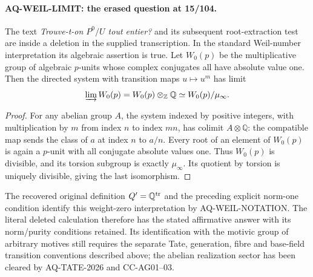 \documentclass[11pt,a4paper]{article}
\theoremstyle{definition}\newtheorem{definition}[theorem]{Definition}
\theoremstyle{remark}\newtheorem{remark}[theorem]{Remark}
\begin{document}
\paragraph{AQ-WEIL-LIMIT: the erased question at 15/104.}
The text \emph{Trouve-t-on $P^0/U$ tout entier?}
and its subsequent root-extraction test are inside a
deletion in the supplied transcription. In the standard
Weil-number interpretation its algebraic assertion is true.
Let $W_0(p)$ be the multiplicative group of algebraic
$p$-units whose complex conjugates all have absolute
value one. Then the directed system with transition
maps $u\mapsto u^m$ has limit
\[
 \varinjlim W_0(p)=W_0(p)\otimes_{\mathbb Z}\mathbb Q
                 \simeq W_0(p)/\mu_\infty .
\]
\begin{proof}
For any abelian group $A$, the system indexed by
positive integers, with multiplication by $m$ from
index $n$ to index $mn$, has colimit
$A\otimes\mathbb Q$: the compatible map sends
the class of $a$ at index $n$ to $a/n$.
Every root of an element of $W_0(p)$ is again
a $p$-unit with all conjugate absolute values one.
Thus $W_0(p)$ is divisible, and its torsion subgroup
is exactly $\mu_\infty$. Its quotient by torsion
is uniquely divisible, giving the last isomorphism.
\end{proof}
The recovered original definition $Q'=\mathbb Q^{\rm tr}$
and the preceding explicit norm-one condition identify
this weight-zero interpretation by AQ-WEIL-NOTATION.
The literal deleted calculation therefore has the stated
affirmative answer with its norm/purity conditions retained.
Its identification with the motivic group of arbitrary
motives still requires the separate Tate, generation,
fibre and base-field transition conventions described above;
the abelian realization sector has been cleared by
AQ-TATE-2026 and CC-AG01--03.
\end{document}
